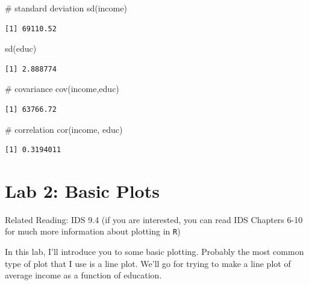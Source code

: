 \documentclass[
  letterpaper,
  DIV=11,
  numbers=noendperiod]{scrreprt}
\newenvironment{Shaded}{\begin{snugshade}}{\end{snugshade}}
\newcommand{\CommentTok}[1]{\textcolor[rgb]{0.37,0.37,0.37}{#1}}
\newcommand{\FunctionTok}[1]{\textcolor[rgb]{0.28,0.35,0.67}{#1}}
\newcommand{\NormalTok}[1]{\textcolor[rgb]{0.00,0.23,0.31}{#1}}
\begin{document}
\begin{Shaded}
\begin{Highlighting}[]
\CommentTok{\# standard deviation}
\FunctionTok{sd}\NormalTok{(income)}
\end{Highlighting}
\end{Shaded}

\begin{verbatim}
[1] 69110.52
\end{verbatim}

\begin{Shaded}
\begin{Highlighting}[]
\FunctionTok{sd}\NormalTok{(educ)}
\end{Highlighting}
\end{Shaded}

\begin{verbatim}
[1] 2.888774
\end{verbatim}

\begin{Shaded}
\begin{Highlighting}[]
\CommentTok{\# covariance}
\FunctionTok{cov}\NormalTok{(income,educ)}
\end{Highlighting}
\end{Shaded}

\begin{verbatim}
[1] 63766.72
\end{verbatim}

\begin{Shaded}
\begin{Highlighting}[]
\CommentTok{\# correlation}
\FunctionTok{cor}\NormalTok{(income, educ)}
\end{Highlighting}
\end{Shaded}

\begin{verbatim}
[1] 0.3194011
\end{verbatim}

\section{Lab 2: Basic Plots}\label{lab-2-basic-plots}

Related Reading: IDS 9.4 (if you are interested, you can read IDS
Chapters 6-10 for much more information about plotting in \texttt{R})

In this lab, I'll introduce you to some basic plotting. Probably the
most common type of plot that I use is a line plot. We'll go for trying
to make a line plot of average income as a function of education.
\end{document}
